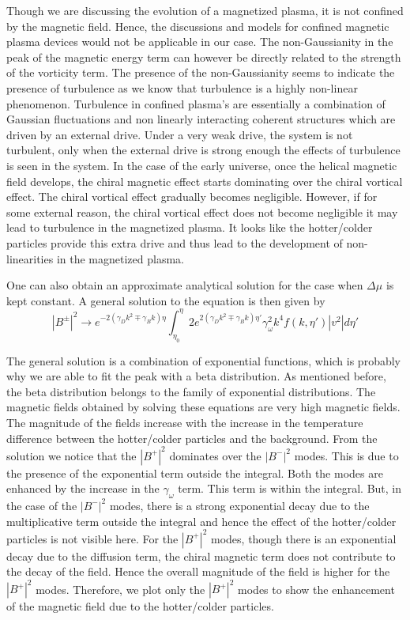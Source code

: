 \documentclass{ws-mpla}
\begin{document}
Though we are discussing the evolution of a magnetized plasma, it is not confined by the magnetic field. Hence, the discussions and models for confined magnetic plasma 
devices would not be applicable in our case. The non-Gaussianity in the peak of the magnetic energy term can however be directly related to the strength of the 
vorticity term. The presence of the non-Gaussianity seems to indicate the presence of turbulence as we know that turbulence is a highly non-linear phenomenon. 
Turbulence in confined plasma's are essentially a combination of Gaussian fluctuations and non linearly interacting coherent structures 
\cite{guszejnov} which are driven by an external drive. Under a very weak drive, the system is not turbulent, only when the external drive 
is strong enough the effects of turbulence is seen in the system. In the case of the early universe, once the helical magnetic field develops, the chiral magnetic effect
starts dominating over the chiral vortical effect. The chiral vortical effect gradually becomes negligible. However, if for some external reason, the chiral vortical 
effect does not become negligible it may lead to turbulence in the magnetized plasma. It looks like the hotter/colder particles provide this extra drive and thus lead 
to the development of non-linearities in the magnetized plasma. 

One can also obtain an approximate analytical solution for the case when $\Delta\mu$ is kept constant. A general solution to the equation is then given by 
\begin{equation}
 |B^{\pm}|^2 \rightarrow e^{-2(\gamma_D k^2 \mp \gamma_B k)\eta}\int_{\eta_0}^\eta 2 
e^{2(\gamma_D k^2 \mp \gamma_B k)\eta'} \gamma_\omega^2 k^4 f(k,\eta')|v^2| d\eta' 
\end{equation}

The general solution is a combination of exponential functions, which is probably why we are able to fit the peak with a beta distribution. As mentioned before, 
the beta distribution belongs to the family of exponential distributions.
The magnetic fields obtained by solving these equations are very high magnetic fields. The magnitude of the fields increase with the increase in the temperature 
difference between the hotter/colder particles and the background. From the solution we notice that the $|B^{+}|^2 $ dominates over the  $|B^{-}|^2 $ modes. This is due to the presence 
of the exponential term outside the integral. Both the modes are enhanced by the increase in the $\gamma_{\omega}$ term. This term is within the integral. 
But, in the case of the $|B^{-}|^2 $ modes, there is a strong exponential decay due to the multiplicative term outside the integral and hence 
the effect of the hotter/colder particles is not visible here. For the  $|B^{+}|^2 $ modes, though there is an exponential decay due to the diffusion term, 
the chiral magnetic term does not contribute to the decay of the field. Hence the overall magnitude of the field is higher for the  $|B^{+}|^2 $  modes. 
Therefore, we plot only the $|B^{+}|^2 $  modes to show the enhancement of the magnetic field due to the hotter/colder particles. 
\end{document}
